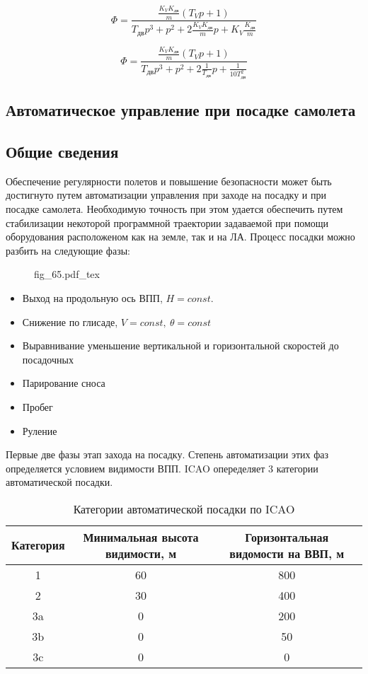\documentclass{article}
\newcommand{\incfig}[1]{
    {#1.pdf_tex}
}
\begin{document}
\[
    \Phi = \frac{\frac{K_V K_\text{дв}}{m}(T_V p + 1)}{T_\text{дв} p^3 + p^2 + 2 \frac{K_V K_\text{дв}}{m}p + K_V \frac{K_\text{дв}}{m}}
\]

\[
    \Phi = \frac{\frac{K_V K_\text{дв}}{m}(T_V p + 1)}{ T_\text{дв}p^3 + p^2 + 2 \frac{1}{T_\text{дв}}p + \frac{1}{10 T_\text{дв}^2}}
\]

\subsection{Автоматическое управление при посадке самолета}
\subsection{Общие сведения}
Обеспечение регулярности полетов и повышение безопасности может быть достигнуто путем автоматизации управления при заходе на посадку и при посадке самолета. Необходимую точность при этом удается обеспечить путем стабилизации некоторой программной траектории задаваемой при помощи оборудования расположеном как на земле, так и на ЛА.
Процесс посадки можно разбить на следующие фазы:
\begin{figure}[H]
    \centering
    \incfig{fig_65}
    \label{fig:fig_65}
\end{figure}
\begin{itemize}
    \item  Выход на продольную ось ВПП, $H=const$.
        \item Снижение по глисаде, $V=const, \ \theta = const$ 
            \item Выравнивание уменьшение вертикальной и горизонтальной скоростей до посадочных
                \item Парирование сноса
                    \item Пробег
                        \item Руление
\end{itemize}
Первые две фазы этап захода на посадку. Степень автоматизации этих фаз определяется условием видимости ВПП. ICAO опеределяет 3 категории автоматической посадки.  
\begin{table}[H]
    \centering
    \caption{Категории автоматической посадки по ICAO}
    \label{tab:label}
    \begin{tabular}{|c|c|c|}
        \toprule
        Категория & Минимальная высота видимости, м & Горизонтальная видомости на ВВП, м \\ 
        \midrule
        1 & 60 & 800  \\
        2 & 30 & 400 \\
        3a & 0 & 200 \\
        3b & 0 & 50 \\
        3c & 0 & 0 \\
        \bottomrule
    \end{tabular}
\end{table}
\end{document}
